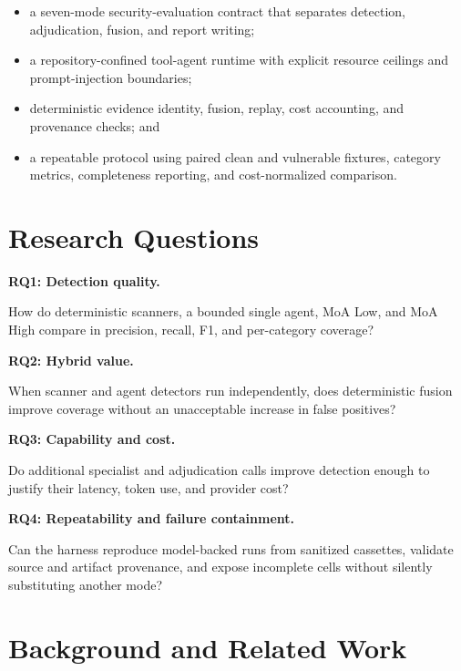 \documentclass[sigconf,nonacm]{acmart}
\begin{document}
\begin{itemize}[leftmargin=*]
  \item a seven-mode security-evaluation contract that separates detection, adjudication, fusion, and report writing;
  \item a repository-confined tool-agent runtime with explicit resource ceilings and prompt-injection boundaries;
  \item deterministic evidence identity, fusion, replay, cost accounting, and provenance checks; and
  \item a repeatable protocol using paired clean and vulnerable fixtures, category metrics, completeness reporting, and cost-normalized comparison.
\end{itemize}

\section{Research Questions}
\label{sec:rqs}

\noindent\textbf{RQ1: Detection quality.}\par
How do deterministic scanners, a bounded single agent, MoA Low, and MoA High compare in precision, recall, F1, and per-category coverage?

\noindent\textbf{RQ2: Hybrid value.}\par
When scanner and agent detectors run independently, does deterministic fusion improve coverage without an unacceptable increase in false positives?

\noindent\textbf{RQ3: Capability and cost.}\par
Do additional specialist and adjudication calls improve detection enough to justify their latency, token use, and provider cost?

\noindent\textbf{RQ4: Repeatability and failure containment.}\par
Can the harness reproduce model-backed runs from sanitized cassettes, validate source and artifact provenance, and expose incomplete cells without silently substituting another mode?

\section{Background and Related Work}
\end{document}
